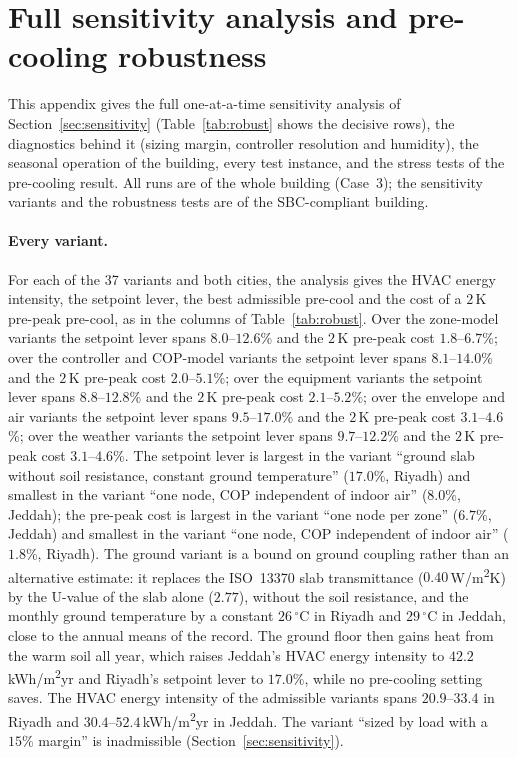 \documentclass[10pt,a4paper,twocolumn]{article}
\theoremstyle{definition}
\begin{document}
\section{Full sensitivity analysis and pre-cooling robustness}\label{S:sensitivity}\label{app:S6}
This appendix gives the full one-at-a-time sensitivity analysis of Section~\ref{sec:sensitivity} (Table~\ref{tab:robust} shows the decisive rows), the diagnostics behind it (sizing margin, controller resolution and humidity), the seasonal operation of the building, every test instance, and the stress tests of the pre-cooling result. All runs are of the whole building (Case~3); the sensitivity variants and the robustness tests are of the SBC-compliant building.

\paragraph{Every variant.} For each of the 37 variants and both cities, the analysis gives the HVAC energy intensity, the setpoint lever, the best admissible pre-cool and the cost of a $2\,$K pre-peak pre-cool, as in the columns of Table~\ref{tab:robust}. Over the zone-model variants the setpoint lever spans $8.0$--$12.6$\% and the $2\,$K pre-peak cost $1.8$--$6.7$\%; over the controller and COP-model variants the setpoint lever spans $8.1$--$14.0$\% and the $2\,$K pre-peak cost $2.0$--$5.1$\%; over the equipment variants the setpoint lever spans $8.8$--$12.8$\% and the $2\,$K pre-peak cost $2.1$--$5.2$\%; over the envelope and air variants the setpoint lever spans $9.5$--$17.0$\% and the $2\,$K pre-peak cost $3.1$--$4.6$\%; over the weather variants the setpoint lever spans $9.7$--$12.2$\% and the $2\,$K pre-peak cost $3.1$--$4.6$\%. The setpoint lever is largest in the variant ``ground slab without soil resistance, constant ground temperature'' ($17.0\%$, Riyadh) and smallest in the variant ``one node, COP independent of indoor air'' ($8.0\%$, Jeddah); the pre-peak cost is largest in the variant ``one node per zone'' ($6.7\%$, Jeddah) and smallest in the variant ``one node, COP independent of indoor air'' ($1.8\%$, Riyadh). The ground variant is a bound on ground coupling rather than an alternative estimate: it replaces the ISO~13370 slab transmittance ($0.40\,$W/m\textsuperscript{2}K) by the U-value of the slab alone ($2.77$), without the soil resistance, and the monthly ground temperature by a constant $26\,^{\circ}$C in Riyadh and $29\,^{\circ}$C in Jeddah, close to the annual means of the record. The ground floor then gains heat from the warm soil all year, which raises Jeddah's HVAC energy intensity to $42.2\,$kWh/m\textsuperscript{2}yr and Riyadh's setpoint lever to $17.0\%$, while no pre-cooling setting saves. The HVAC energy intensity of the admissible variants spans $20.9$--$33.4$ in Riyadh and $30.4$--$52.4$\,kWh/m\textsuperscript{2}yr in Jeddah. The variant ``sized by load with a $15\%$ margin'' is inadmissible (Section~\ref{sec:sensitivity}).
\end{document}
